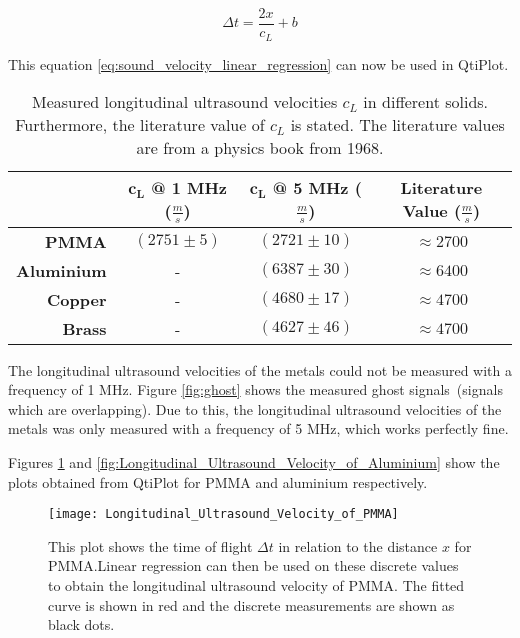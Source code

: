 \begin{equation}
\Delta t = \frac{2x}{c_L} + b
\label{eq:sound_velocity_linear_regression}
\end{equation}

This equation \ref{eq:sound_velocity_linear_regression} can now be used in QtiPlot.

\begin{table}[H]
	\centering
	\renewcommand{\arraystretch}{1.3}
	\begin{tabular}{r||c|c|c}
		& $\boldsymbol{c_L}$ \textbf{@ 1 MHz} ($\frac{\si{m}}{\si{s}}$) & $\boldsymbol{c_L}$ \textbf{@ 5 MHz} ($\frac{\si{m}}{\si{s}}$) & \textbf{Literature Value} ($\frac{\si{m}}{\si{s}}$) \cite{kohlrausch} \\
		\hline\hline
		\textbf{PMMA} & $(2751\pm 5)$ & $(2721\pm 10)$ & $\approx 2700$ \\
		\textbf{Aluminium} & - & $(6387\pm 30)$ & $\approx 6400$ \\
		\textbf{Copper} & - & $(4680\pm 17)$ & $\approx 4700$ \\
		\textbf{Brass} & - & $(4627\pm 46)$ & $\approx 4700$ \\
	\end{tabular}
	\caption{Measured longitudinal ultrasound velocities $c_L$ in different solids. Furthermore, the literature value of $c_L$ is stated. The literature values are from a physics book from 1968.}
	\label{tab:Longitudinal_Ultrasound_Velocities_in_Solids}
\end{table}

The longitudinal ultrasound velocities of the metals could not be measured with a frequency of 1 MHz. Figure \ref{fig:ghost} shows the measured \flqq ghost signals\frqq\ (signals which are overlapping). Due to this, the longitudinal ultrasound velocities of the metals was only measured with a frequency of 5 MHz, which works perfectly fine.

Figures \ref{fig:Longitudinal_Ultrasound_Velocity_of_PMMA} and \ref{fig:Longitudinal_Ultrasound_Velocity_of_Aluminium} show the plots obtained from QtiPlot for PMMA and aluminium respectively.

\begin{figure}[H]
	\centering
	\texttt{[image: Longitudinal\_Ultrasound\_Velocity\_of\_PMMA]}
	\caption{This plot shows the time of flight $\Delta t$ in relation to the distance $x$ for PMMA.Linear regression can then be used on these discrete values to obtain the longitudinal ultrasound velocity of PMMA. The fitted curve is shown in red and the discrete measurements are shown as black dots.}
	\label{fig:Longitudinal_Ultrasound_Velocity_of_PMMA}
\end{figure}

